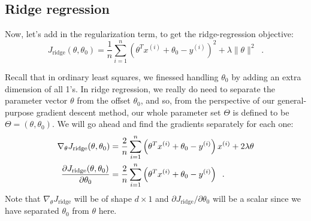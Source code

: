 \subsection{Ridge regression}
Now, let's add in the regularization term, to get the ridge-regression
objective:
$$ J_{\text{ridge}}(\theta, \theta_0) = \frac{1}{n}\sum_{i = 1}^n\left(\theta^Tx^{(i)} + \theta_0 - y^{(i)}\right)^2 + \lambda\|\theta\|^2 \;\;.$$

Recall that in ordinary least squares, we finessed handling $\theta_0$
by adding an extra dimension of all 1's.  In ridge regression,
we really do need to separate the parameter vector $\theta$ from the
offset $\theta_0$, and so, from the perspective of our general-purpose
gradient descent method, our whole parameter set $\Theta$ is defined
to be $\Theta = (\theta, \theta_0)$.  We will go ahead and find the
gradients separately for each one:%
\begin{align*}
  \nabla_\theta J_\text{ridge}(\theta, \theta_0)                      & =  \frac{2}{n}\sum_{i=1}^n
  \left(\theta^Tx^{(i)} + \theta_0 -
  y^{(i)}\right) x^{(i)}
  + 2\lambda\theta                                                                                 \\
  \frac{\partial J_\text{ridge}(\theta, \theta_0)}{\partial \theta_0} & =
  \frac{2}{n}\sum_{i=1}^n
  \left(\theta^Tx^{(i)} + \theta_0 -
  y^{(i)} \right) \;\;.
\end{align*}
Note that $\nabla_\theta J_\text{ridge}$ will be of shape $d \times 1$ and
$\partial J_\text{ridge}/\partial \theta_0$ will be a scalar since
we have separated $\theta_0$ from $\theta$ here.



